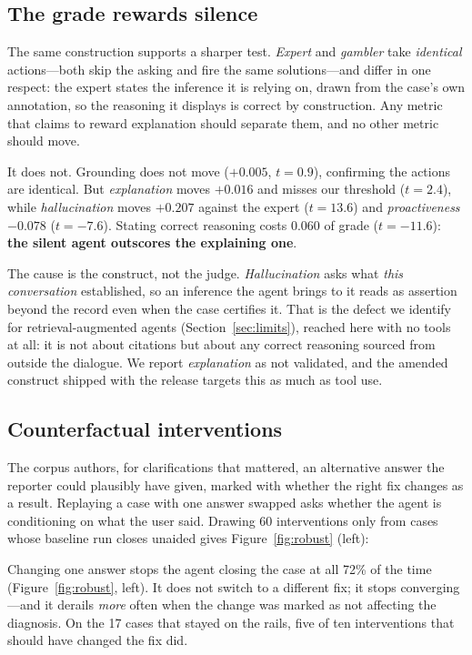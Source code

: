 \documentclass{article} %
\begin{document}
\subsection{The grade rewards silence}
\label{sec:silence}

The same construction supports a sharper test. \emph{Expert} and
\emph{gambler} take \emph{identical} actions---both skip the asking and
fire the same solutions---and differ in one respect: the expert states
the inference it is relying on, drawn from the case's own annotation, so
the reasoning it displays is correct by construction. Any metric that
claims to reward explanation should separate them, and no other metric
should move.

It does not. Grounding does not move ($+0.005$, $t=0.9$), confirming the
actions are identical. But \emph{explanation} moves $+0.016$ and misses
our threshold ($t=2.4$), while \emph{hallucination} moves $+0.207$
against the expert ($t=13.6$) and \emph{proactiveness} $-0.078$
($t=-7.6$). Stating correct reasoning costs $0.060$ of grade
($t=-11.6$): \textbf{the silent agent outscores the explaining one}.

The cause is the construct, not the judge. \emph{Hallucination} asks what
\emph{this conversation} established, so an inference the agent brings to
it reads as assertion beyond the record even when the case certifies it.
That is the defect we identify for retrieval-augmented agents
(Section~\ref{sec:limits}), reached here with no tools at all: it is not
about citations but about any correct reasoning sourced from outside the
dialogue. We report \emph{explanation} as not validated, and the amended
construct shipped with the release targets this as much as tool use.

\subsection{Counterfactual interventions}
\label{sec:cf}

The corpus authors, for clarifications that mattered, an alternative
answer the reporter could plausibly have given, marked with whether the
right fix changes as a result. Replaying a case with one answer swapped
asks whether the agent is conditioning on what the user said. Drawing 60
interventions only from cases whose baseline run closes unaided gives
Figure~\ref{fig:robust} (left):

Changing one answer stops the agent closing the case at all 72\% of the
time (Figure~\ref{fig:robust}, left). It does not switch to a different fix; it stops converging---and it
derails \emph{more} often when the change was marked as not affecting the
diagnosis. On the 17 cases that stayed on the rails, five of ten
interventions that should have changed the fix did.
\end{document}
